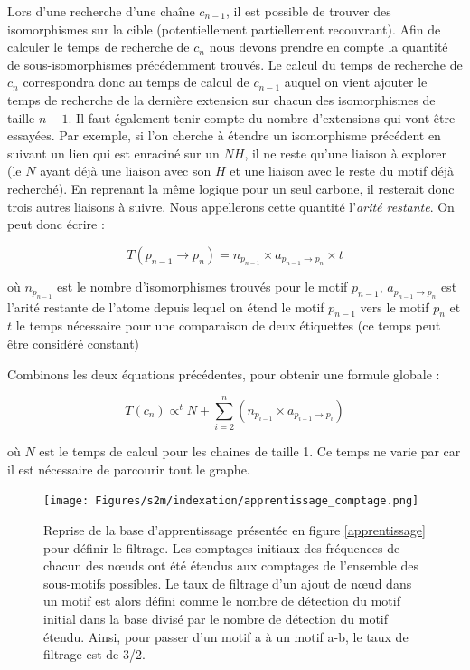 Lors d'une recherche d'une chaîne $c_{n-1}$, il est possible de trouver des isomorphismes sur la cible (potentiellement partiellement recouvrant).
Afin de calculer le temps de recherche de $c_n$ nous devons prendre en compte la quantité de sous-isomorphismes précédemment trouvés.
Le calcul du temps de recherche de $c_n$ correspondra donc au temps de calcul de $c_{n-1}$ auquel on vient ajouter le temps de recherche de la dernière extension sur chacun des isomorphismes de taille $n-1$.
Il faut également tenir compte du nombre d'extensions qui vont être essayées.
Par exemple, si l'on cherche à étendre un isomorphisme précédent en suivant un lien qui est enraciné sur un $NH$, il ne reste qu'une liaison à explorer (le $N$ ayant déjà une liaison avec son $H$ et une liaison avec le reste du motif déjà recherché).
En reprenant la même logique pour un seul carbone, il resterait donc trois autres liaisons à suivre.
Nous appellerons cette quantité l'\textit{arité restante}.
On peut donc écrire :

\begin{equation}
 T(p_{n-1} \rightarrow p_n) = n_{p_{n-1}} \times a_{p_{n-1} \rightarrow p_n} \times t
\end{equation}

où $n_{p_{n-1}}$ est le nombre d'isomorphismes trouvés pour le motif $p_{n-1}$, $a_{p_{n-1} \rightarrow p_n}$ est l'arité restante
de l'atome depuis lequel on étend le motif $p_{n-1}$ vers le motif $p_n$ et $t$ le temps nécessaire pour une comparaison de deux
étiquettes (ce temps peut être considéré constant)

Combinons les deux équations précédentes, pour obtenir une formule globale :

\begin{equation}
 T(c_n) \propto^t N + \sum_{i=2}^n (n_{p_{i-1}} \times a_{p_{i-1} \rightarrow p_i})
\end{equation}

où $N$ est le temps de calcul pour les chaines de taille 1.
Ce temps ne varie par car il est nécessaire de parcourir tout le graphe.

\begin{figure}[!ht]
  \begin{center}
    \texttt{[image: Figures/s2m/indexation/apprentissage\_comptage.png]}
    \caption{\label{app_compt}Reprise de la base d'apprentissage présentée en figure \ref{apprentissage} pour définir le filtrage.
    Les comptages initiaux des fréquences de chacun des n\oe{}uds ont été étendus aux comptages de l'ensemble des sous-motifs possibles.
    Le taux de filtrage d'un ajout de n\oe{}ud dans un motif est alors défini comme le nombre de détection du motif initial dans la base divisé par le nombre de détection du motif étendu.
    Ainsi, pour passer d'un motif a à un motif a-b, le taux de filtrage est de 3/2.}
  \end{center}
\end{figure}

